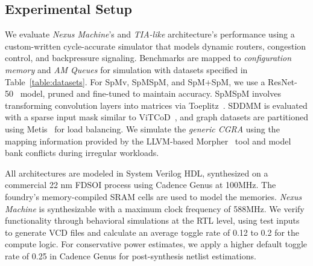 \subsection{Experimental Setup}
We evaluate \textit{Nexus Machine}'s and \textit{TIA-like} architecture's performance using a custom-written cycle-accurate simulator that models dynamic routers, congestion control, and backpressure signaling. 
Benchmarks are mapped to \textit{configuration memory} and \textit{AM Queues} for simulation with datasets specified in Table~\ref{table:datasets}.
For SpMv, SpMSpM, and SpM+SpM, we use a ResNet-50~\cite{resnet50} model, pruned and fine-tuned to maintain accuracy. SpMSpM involves transforming convolution layers into matrices via Toeplitz~\cite{toeplitz}. SDDMM is evaluated with a sparse input mask similar to ViTCoD~\cite{vitcod}, and graph datasets are partitioned using Metis~\cite{metis} for load balancing.
We simulate the \textit{generic CGRA} using the mapping information provided by the LLVM-based Morpher~\cite{morpher} tool and model bank conflicts during irregular workloads. 

All architectures are modeled in System Verilog HDL, synthesized on a commercial 22 nm FDSOI process using Cadence Genus at 100MHz. The foundry’s memory-compiled SRAM cells are used to model the memories.
\textit{Nexus Machine} is synthesizable with a maximum clock frequency of 588MHz.
We verify functionality through behavioral simulations at the RTL level, using test inputs to generate VCD files and calculate an average toggle rate of 0.12 to 0.2 for the compute logic. For conservative power estimates, we apply a higher default toggle rate of 0.25 in Cadence Genus for post-synthesis netlist estimations.

